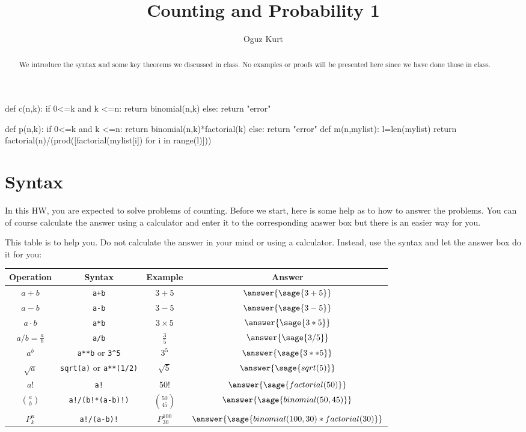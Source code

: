 \documentclass{ximera}
\title{Counting and Probability 1}
\author{Oguz Kurt}
\begin{document}
\begin{abstract}
We introduce the syntax and some key theorems we discussed in class. No examples or proofs will be presented here since we have done those in class.
\end{abstract}
\maketitle

\begin{sagesilent}
def c(n,k):
    if 0<=k and k <=n:
        return binomial(n,k)
    else:
        return "error"

def p(n,k):
    if 0<=k and k <=n:
        return binomial(n,k)*factorial(k)
    else:
        return "error"
def m(n,mylist):
    l=len(mylist)
    return factorial(n)/(prod([factorial(mylist[i]) for i in range(l)]))
\end{sagesilent}

\section*{Syntax}
In this HW, you are expected to solve problems of counting. Before we start, here is some help as to how to answer the problems. You can of course calculate the answer using a calculator and enter it to the corresponding answer box but there is an easier way for you. 

\hspace{0.5cm}

\begin{exercise} This table is to help you. Do not calculate the answer in your mind or using a calculator. Instead, use the syntax and let the answer box do it for you:

\begin{tabular}{c|c|c|c}
Operation & Syntax & Example & Answer 
\\
\hline
$a+b$ & {\color{red} \verb|a+b|} & $3+5$ & $\answer{\sage{3+5} }$
\\
\hline
$a- b$ & {\color{red} \verb|a-b|} & $3-5$ & $\answer{\sage{3-5} }$
\\
\hline
$a\cdot b$ & {\color{red} \verb|a*b| } & $3\times 5$ & $\answer{\sage{3*5} }$
\\
\hline
$a/b=\frac{a}{b}$ & {\color{red} \verb|a/b|} & $\frac{3}{5}$ & $\answer{\sage{3/5} }$
\\
\hline
$a^b$ & {\color{red} \verb|a**b| or \verb|3^5|} & $3^5$ & $\answer{\sage{3**5} }$
\\
\hline
$\sqrt{a}$ & {\color{red} \verb|sqrt(a)| or \verb|a**(1/2)|} & $\sqrt{5}$ & $\answer{\sage{sqrt(5)} }$
\\
\hline
$a!$ & {\color{red} \verb|a!|} & $50!$ & $\answer{\sage{factorial(50)} }$
\\
\hline
$\binom{a}{b}$ & {\color{red} \verb|a!/(b!*(a-b)!)|} & $\binom{50}{45}$ & $\answer{\sage{binomial(50,45)}}$ 
\\
\hline
$P_k^n$ & {\color{red} \verb|a!/(a-b)!|} & $P_{30}^{100}$ & $\answer{\sage{binomial(100,30)*factorial(30)} }$ 
\\
\end{tabular}
\end{exercise}
\end{document}
